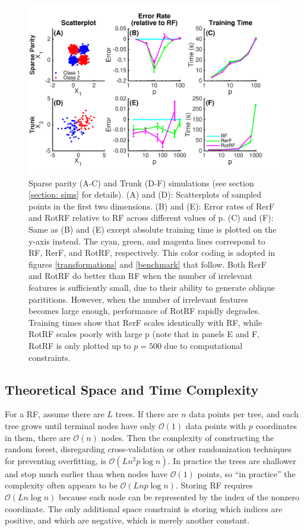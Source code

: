 \documentclass{article}
\providecommand{\mc}[1]{\mathcal{#1}}
\begin{document}
\begin{figure}[ht]
\vskip 0.2in
\begin{center}
\centerline{\includegraphics[width=\columnwidth]{../Figures/pdf/Fig2_simulations}}
\caption{Sparse parity (A-C) and Trunk (D-F) simulations (see section \ref{section: sims} for details). (A) and (D): Scatterplots of sampled points in the first two dimensions. (B) and (E): Error rates of RerF and RotRF relative to RF across different values of p. (C) and (F): Same as (B) and (E) except absolute training time is plotted on the y-axis instead. The cyan, green, and magenta lines correspond to RF, RerF, and RotRF, respectively. This color coding is adopted in figures \ref{transformations} and \ref{benchmark} that follow. Both RerF and RotRF do better than RF when the number of irrelevant features is sufficiently small, due to their ability to generate oblique parititions. However, when the number of irrelevant features becomes large enough, performance of RotRF rapidly degrades. Training times show that RerF scales identically with RF, while RotRF scales poorly with large p (note that in panels E and F, RotRF is only plotted up to $p = 500$ due to computational constraints.}
\label{simulations}
\end{center}
\vskip -0.2in
\end{figure}

\subsection{Theoretical Space and Time Complexity}

For a RF, assume there are $L$ trees.  
If there are $n$ data points per tree, and each tree grows until terminal nodes have only $\mc O(1)$ data points with $p$ coordinates in them, there are $\mc O(n)$ nodes.
Then the complexity of constructing the random forest, disregarding cross-validation or other randomization techniques for preventing overfitting, is $\mc O(Ln^2p\log n)$. In practice the trees are shallower and stop much earlier than when nodes have $\mc O(1)$ points, so ``in practice'' the complexity often appears to be $\mc O(Lnp\log n)$. Storing RF requires $\mc{O}(L n\log n )$ because each node can be represented by the index of the nonzero coordinate. The only additional space constraint is storing which indices are positive, and which are negative, which is merely another constant.
\end{document}
